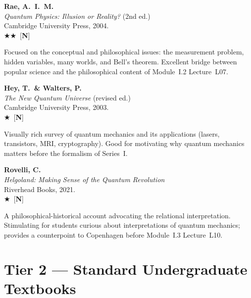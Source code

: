 \documentclass[11pt,a4paper]{article}
\newcommand{\recommended}{$\bigstar\bigstar$}
\newcommand{\useful}{$\bigstar$}
\newenvironment{bibentry}[1]{\begin{tcolorbox}[entrybox=#1,top=4pt,bottom=4pt]}{\end{tcolorbox}\smallskip}
\begin{document}
\begin{bibentry}{t1light}
\textbf{Rae, A.~I.~M.}\\
\textit{Quantum Physics: Illusion or Reality?} (2nd ed.)\\
Cambridge University Press, 2004.\\[3pt]
\recommended\ [\textbf{N}]\\[3pt]
\begin{tcolorbox}[annotbox]
Focused on the conceptual and philosophical issues: the measurement problem,
hidden variables, many worlds, and Bell's theorem. Excellent bridge between
popular science and the philosophical content of Module~I.2 Lecture~L07.
\end{tcolorbox}
\end{bibentry}

\begin{bibentry}{t1light}
\textbf{Hey, T.\ \& Walters, P.}\\
\textit{The New Quantum Universe} (revised ed.)\\
Cambridge University Press, 2003.\\[3pt]
\useful\ [\textbf{N}]\\[3pt]
\begin{tcolorbox}[annotbox]
Visually rich survey of quantum mechanics and its applications (lasers, transistors,
MRI, cryptography). Good for motivating why quantum mechanics matters before
the formalism of Series~I.
\end{tcolorbox}
\end{bibentry}

\begin{bibentry}{t1light}
\textbf{Rovelli, C.}\\
\textit{Helgoland: Making Sense of the Quantum Revolution}\\
Riverhead Books, 2021.\\[3pt]
\useful\ [\textbf{N}]\\[3pt]
\begin{tcolorbox}[annotbox]
A philosophical-historical account advocating the relational interpretation.
Stimulating for students curious about interpretations of quantum mechanics;
provides a counterpoint to Copenhagen before Module~I.3 Lecture~L10.
\end{tcolorbox}
\end{bibentry}

\newpage
\section{Tier 2 --- Standard Undergraduate Textbooks}
\label{sec:t2}
\end{document}
